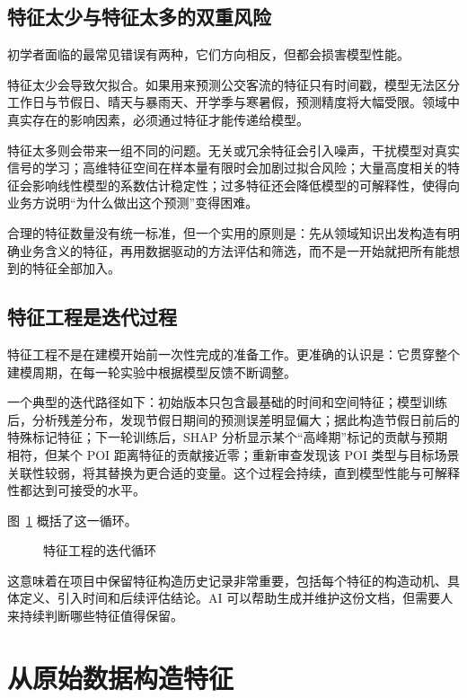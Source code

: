 \subsection{特征太少与特征太多的双重风险}

初学者面临的最常见错误有两种，它们方向相反，但都会损害模型性能。

特征太少会导致欠拟合。如果用来预测公交客流的特征只有时间戳，模型无法区分工作日与节假日、晴天与暴雨天、开学季与寒暑假，预测精度将大幅受限。领域中真实存在的影响因素，必须通过特征才能传递给模型。

特征太多则会带来一组不同的问题。无关或冗余特征会引入噪声，干扰模型对真实信号的学习；高维特征空间在样本量有限时会加剧过拟合风险；大量高度相关的特征会影响线性模型的系数估计稳定性；过多特征还会降低模型的可解释性，使得向业务方说明“为什么做出这个预测”变得困难。

合理的特征数量没有统一标准，但一个实用的原则是：先从领域知识出发构造有明确业务含义的特征，再用数据驱动的方法评估和筛选，而不是一开始就把所有能想到的特征全部加入。

\subsection{特征工程是迭代过程}

特征工程不是在建模开始前一次性完成的准备工作。更准确的认识是：它贯穿整个建模周期，在每一轮实验中根据模型反馈不断调整。

一个典型的迭代路径如下：初始版本只包含最基础的时间和空间特征；模型训练后，分析残差分布，发现节假日期间的预测误差明显偏大；据此构造节假日前后的特殊标记特征；下一轮训练后，SHAP 分析显示某个“高峰期”标记的贡献与预期相符，但某个 POI 距离特征的贡献接近零；重新审查发现该 POI 类型与目标场景关联性较弱，将其替换为更合适的变量。这个过程会持续，直到模型性能与可解释性都达到可接受的水平。

图~\ref{fig:ch06_loop} 概括了这一循环。

\begin{figure}[H]
  \centering
  \caption{特征工程的迭代循环}
  \label{fig:ch06_loop}
\end{figure}

这意味着在项目中保留特征构造历史记录非常重要，包括每个特征的构造动机、具体定义、引入时间和后续评估结论。AI 可以帮助生成并维护这份文档，但需要人来持续判断哪些特征值得保留。


\section{从原始数据构造特征}

